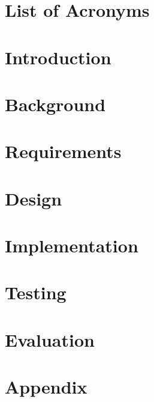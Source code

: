 \documentclass[a4paper,twoside]{report}
\begin{document}
\begin{abstract}
\end{abstract}

\tableofcontents


\chapter*{List of Acronyms}
\begin{acronym}
\end{acronym}


\chapter{Introduction}


\chapter{Background}


\chapter{Requirements}


\chapter{Design}


\chapter{Implementation}


\chapter{Testing}


\chapter{Evaluation}


\appendix
\chapter{Appendix}


\renewcommand\bibname{References}
%
\end{document}
